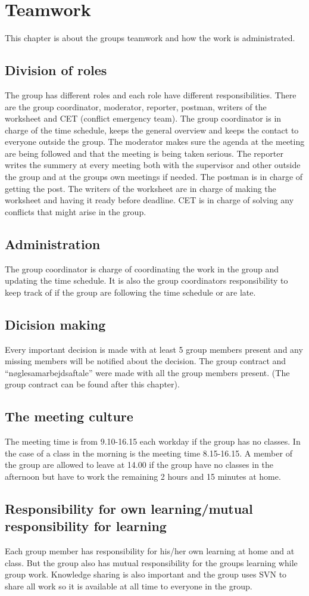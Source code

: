 \chapter{Teamwork}
This chapter is about the groups teamwork and how the work is administrated.
\section{Division of roles}
The group has different roles and each role have different responsibilities. There are the group coordinator, moderator, reporter, postman, writers of the worksheet and CET (conflict emergency team).
The group coordinator is in charge of the time schedule, keeps the general overview and keeps the contact to everyone outside the group. 
The moderator makes sure the agenda at the meeting are being followed and that the meeting is being taken serious.
The reporter writes the summery at every meeting both with the supervisor and other outside the group and at the groups own meetings if needed.
The postman is in charge of getting the post.
The writers of the worksheet are in charge of making the worksheet and having it ready before deadline.
CET is in charge of solving any conflicts that might arise in the group.
\section{Administration}
The group coordinator is charge of coordinating the work in the group and updating the time schedule. It is also the group coordinators responsibility to keep track of if the group are following the time schedule or are late.
\section{Dicision making}
Every important decision is made with at least 5 group members present and any missing members will be notified about the decision. The group contract and “nøglesamarbejdsaftale” were made with all the group members present. (The group contract can be found after this chapter).
\section{The meeting culture}
The meeting time is from 9.10-16.15 each workday if the group has no classes. In the case of a class in the morning is the meeting time 8.15-16.15.
A member of the group are allowed to leave at 14.00 if the group have no classes in the afternoon but have to work the remaining 2 hours and 15 minutes at home.
\section{Responsibility for own learning/mutual responsibility for learning}
Each group member has responsibility for his/her own learning at home and at class. But the group also has mutual responsibility for the groups learning while group work. 
Knowledge sharing is also important and the group uses SVN to share all work so it is available at all time to everyone in the group.